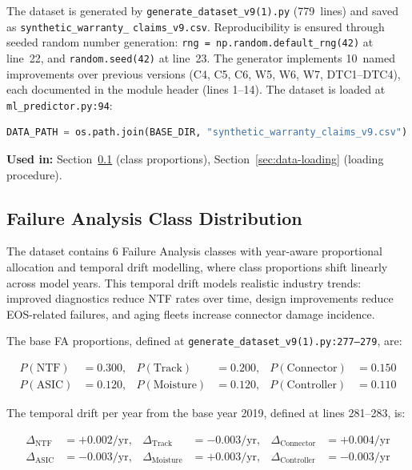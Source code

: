 \documentclass[10pt,a4paper]{article}
\begin{document}
The dataset is generated by \texttt{generate\_dataset\_v9(1).py}
(779~lines) and saved as
\texttt{synthetic\_warranty\_}\linebreak
\texttt{claims\_v9.csv}.
Reproducibility is ensured through seeded random number generation:
\texttt{rng = np.random.default\_rng(42)} at line~22, and
\texttt{random.seed(42)} at line~23.
The generator implements 10~named improvements over previous versions
(C4, C5, C6, W5, W6, W7, DTC1--DTC4), each documented in the module
header (lines 1--14).
The dataset is loaded at \texttt{ml\_predictor.py:94}:

\begin{lstlisting}[language=Python]
DATA_PATH = os.path.join(BASE_DIR, "synthetic_warranty_claims_v9.csv")
\end{lstlisting}

\textbf{Used in:} Section~\ref{sec:fa-class-distribution} (class proportions), Section~\ref{sec:data-loading} (loading procedure).

\subsection{Failure Analysis Class Distribution}
\label{sec:fa-class-distribution}

The dataset contains 6 Failure Analysis classes with year-aware proportional allocation and temporal drift modelling, where class proportions shift linearly across model years. This temporal drift models realistic industry trends: improved diagnostics reduce NTF rates over time, design improvements reduce EOS-related failures, and aging fleets increase connector damage incidence.

The base FA proportions, defined at \texttt{generate\_dataset\_v9(1).py:277--279}, are:

\begin{align}
P(\text{NTF}) &= 0.300, & P(\text{Track}) &= 0.200, & P(\text{Connector}) &= 0.150 \label{eq:fa-base-1} \\
P(\text{ASIC}) &= 0.120, & P(\text{Moisture}) &= 0.120, & P(\text{Controller}) &= 0.110 \label{eq:fa-base-2}
\end{align}

The temporal drift per year from the base year 2019, defined at lines 281--283, is:

\begin{align}
\Delta_{\text{NTF}} &= +0.002/\text{yr}, & \Delta_{\text{Track}} &= -0.003/\text{yr}, & \Delta_{\text{Connector}} &= +0.004/\text{yr} \label{eq:fa-drift-1} \\
\Delta_{\text{ASIC}} &= -0.003/\text{yr}, & \Delta_{\text{Moisture}} &= +0.003/\text{yr}, & \Delta_{\text{Controller}} &= -0.003/\text{yr} \label{eq:fa-drift-2}
\end{align}
\end{document}
